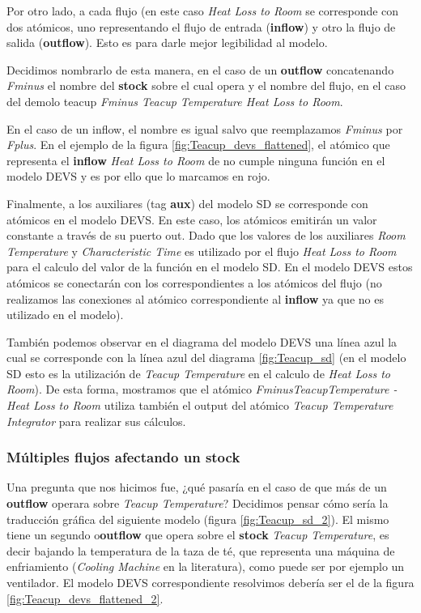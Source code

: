 Por otro lado, a cada flujo (en este caso \textit{Heat Loss to Room} se corresponde con dos atómicos, uno representando el flujo de entrada (\textbf{inflow}) y otro la flujo de salida (\textbf{outflow}). Esto es para darle mejor legibilidad al modelo.

Decidimos nombrarlo de esta manera, en el caso de un \textbf{outflow} concatenando \textit{Fminus} el nombre del \textbf{stock} sobre el cual opera y el nombre del flujo, en el caso del demolo teacup \textit{Fminus Teacup Temperature Heat Loss to Room}.

En el caso de un inflow, el nombre es igual salvo que reemplazamos \textit{Fminus} por \textit{Fplus}. En el ejemplo de la figura \ref{fig:Teacup_devs_flattened}, el atómico que representa el \textbf{inflow} \textit{Heat Loss to Room} de no cumple ninguna función en el modelo DEVS y es por ello que lo marcamos en rojo. 

Finalmente, a los auxiliares (tag \textbf{aux}) del modelo SD se corresponde con atómicos en el modelo DEVS. En este caso, los atómicos emitirán un valor constante a través de su puerto out. Dado que los valores de los auxiliares \textit{Room Temperature} y \textit{Characteristic Time} es utilizado por el flujo \textit{Heat Loss to Room} para el calculo del valor de la función en el modelo SD. En el modelo DEVS estos atómicos se conectarán con los correspondientes a los atómicos del flujo (no realizamos las conexiones al atómico correspondiente al \textbf{inflow} ya que no es utilizado en el modelo).

También podemos observar en el diagrama del modelo DEVS una línea azul la cual se corresponde con la línea azul del diagrama \ref{fig:Teacup_sd} (en el modelo SD esto es la utilización de \textit{Teacup Temperature} en el calculo de \textit{Heat Loss to Room}). De esta forma, mostramos que el atómico \textit{FminusTeacupTemperature - Heat Loss to Room} utiliza también el output del atómico \textit{Teacup Temperature Integrator} para realizar sus cálculos. 

\subsubsection{Múltiples flujos afectando un stock}
Una pregunta que nos hicimos fue, ¿qué pasaría en el caso de que más de un \textbf{outflow} operara sobre \textit{Teacup Temperature}?
Decidimos pensar cómo sería la traducción gráfica del siguiente modelo (figura \ref{fig:Teacup_sd_2}). El mismo tiene un segundo o\textbf{outflow} que opera sobre el \textbf{stock} \textit{Teacup Temperature}, es decir bajando la temperatura de la taza de té, que representa una máquina de enfriamiento (\textit{Cooling Machine} en la literatura), como puede ser por ejemplo un ventilador. El modelo DEVS correspondiente resolvimos debería ser el de la figura \ref{fig:Teacup_devs_flattened_2}. 

